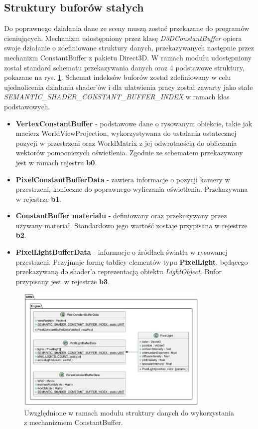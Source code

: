 \subsection{Struktury buforów stałych}
	Do poprawnego działania dane ze sceny muszą zostać przekazane do programów cieniujących. Mechanizm udostępniony przez klasę \textit{D3DConstantBuffer} opiera swoje działanie o zdefiniowane struktury danych, przekazywanych następnie przez mechanizm ConstantBuffer z pakietu Direct3D. W ramach modułu udostępniony został standard schematu przekazywania danych oraz 4 podstawowe struktury, pokazane na rys. \ref{UML_StandardConstantBuffers}. Schemat indeksów buforów został zdefiniowany w celu ujednolicenia działania shader'ów i dla ułatwienia pracy został zawarty jako stałe \textit{SEMANTIC\_SHADER\_CONSTANT\_BUFFER\_INDEX} w ramach klas podstawowych.
	\begin{itemize}
		\item \textbf{VertexConstantBuffer} - podstawowe dane o rysowanym obiekcie, takie jak macierz WorldViewProjection, wykorzystywana do ustalania ostatecznej pozycji w przestrzeni oraz  WorldMatrix z jej odwrotnością do obliczania wektorów pomocniczych oświetlenia. Zgodnie ze schematem przekazywany jest w ramach rejestru \textbf{b0}.
		\item \textbf{PixelConstantBufferData} - zawiera informacje o pozycji kamery w przestrzeni, konieczne do poprawnego wyliczania oświetlenia. Przekazywana w rejestrze \textbf{b1}.
		\item \textbf{ConstantBuffer materiału} - definiowany oraz przekazywany przez używany materiał. Standardowo jego wartość zostaje przypisana w rejestrze \textbf{b2}.
		\item \textbf{PixelLightBufferData} - informacje o źródłach światła w rysowanej przestrzeni. Przyjmuje formę tablicy elementów typu \textbf{PixelLight}, będącego przekazywaną do shader'a reprezentacją obiektu \textit{LightObject}. Bufor przypisany jest w rejestrze \textbf{b3}.
	\end{itemize}
	
	\begin{figure}[h!]
		\centering
		\includegraphics[width=350px]{images/UML/constantbuffers.png}
		\caption{Uwzględnione w ramach modułu struktury danych do wykorzystania z mechanizmem ConstantBuffer.}
		\label{UML_StandardConstantBuffers}
	\end{figure}
	

